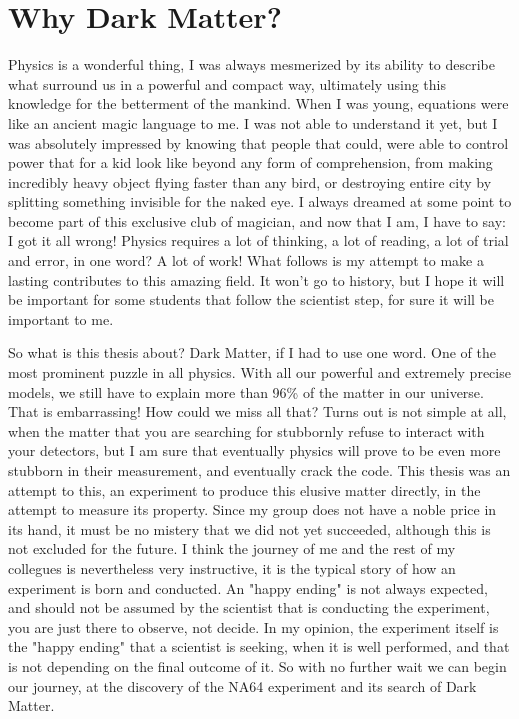 
\newcommand{\pdirone}{chapters/plots/chapter1}


\chapter{Why Dark Matter?} %

\label{chapter1}

Physics is a wonderful thing, I was always mesmerized by its ability to describe what surround us in a powerful and compact way, ultimately using this knowledge for the betterment of the mankind. When I was young, equations were like an ancient magic language to me. I was not able to understand it yet, but I was absolutely impressed by knowing that people that could, were able to control power that for a kid look like beyond any form of comprehension, from making incredibly heavy object flying faster than any bird, or destroying entire city by splitting something invisible for the naked eye. I always dreamed at some point to become part of this exclusive club of magician, and now that I am, I have to say: I got it all wrong! Physics requires a lot of thinking, a lot of reading, a lot of trial and error, in one word? A lot of work! What follows is my attempt to make a lasting contributes to this amazing field. It won't go to history, but I hope it will be important for some students that follow the scientist step, for sure it will be important to me.

So what is this thesis about? Dark Matter, if I had to use one word. One of the most prominent puzzle in all physics. With all our powerful and extremely precise models, we still have to explain more than 96\% of the matter in our universe. That is embarrassing! How could we miss all that? Turns out is not simple at all, when the matter that you are searching for stubbornly refuse to interact with your detectors, but I am sure that eventually physics will prove to be even more stubborn in their measurement, and eventually crack the code. This thesis was an attempt to this, an experiment to produce this elusive matter directly, in the attempt to measure its property. Since my group does not have a noble price in its hand, it must be no mistery that we did not yet succeeded, although this is not excluded for the future. I think the journey of me and the rest of my collegues is nevertheless very instructive, it is the typical story of how an experiment is born and conducted. An "happy ending" is not always expected, and should not be assumed by the scientist that is conducting the experiment, you are just there to observe, not decide. In my opinion, the experiment itself is the "happy ending" that a scientist is seeking, when it is well performed, and that is not depending on the final outcome of it. So with no further wait we can begin our journey, at the discovery of the NA64 experiment and its search of Dark Matter.

